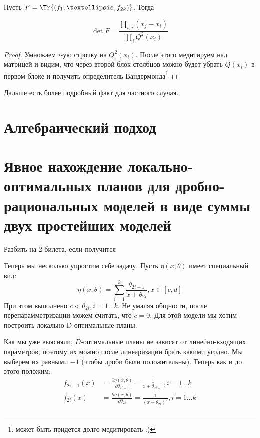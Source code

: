 Пусть $F = \Tr{(f_1, …, f_{2k})}$. Тогда 
\begin{thm}
\begin{equation}
\label{rationModelDet}
\det F = \frac{\prod\limits_{i,j} (x_j - x_i)}{\prod\limits_{i} Q^2(x_i)}
\end{equation}
\end{thm}
\begin{proof}
Умножаем  $i$-ую строчку на $Q^2(x_i)$. После этого медитируем над матрицей и видим, что через второй блок столбцов можно будет убрать $Q(x_i)$ в первом блоке и получить определитель Вандермонда\footnote{может быть придется долго медитировать :)}
\end{proof}

{\color{blue} Дальше есть более подробный факт для частного случая. }

\section{Алгебраический подход}
\section{Явное нахождение локально-оптимальных планов для дробно-рациональных моделей в виде суммы двух простейших моделей}

{\color{blue} Разбить на 2 билета, если получится}

Теперь мы несколько упростим себе задачу. Пусть $\eta(x, \theta)$ имеет специальный вид:
\begin{equation}
\label{simplRatModel}
\eta(x,\theta) = \sum\limits_{i=1}^{k} \frac{\theta_{2i-1}}{x+\theta_{2i}}, x\in[c,d]
\end{equation}
При этом выполнено $c < \theta_{2i}, i=1…k$. Не умаляя общности, после перепарамметризации можем считать,  что $c=0$. Для этой модели мы хотим построить локально D-оптимальные планы.

Как мы уже выясняли, $D$-оптимальные планы не зависят от линейно-входящих параметров, поэтому их можно после линеаризации брать какими угодно. Мы выберем их равными $-1$ (чтобы дроби были положительны). Теперь как и до этого положим:
\begin{align*}
f_{2i-1}(x) &= \frac{\partial \eta(x, \theta)}{\partial{\theta_{2i-1}}} = \frac{1}{x+\theta_{2i-1}}, i =1 … k \\
f_{2i}(x) &= \frac{\partial \eta(x, \theta)}{\partial{\theta_{2i}}} = \frac{1}{(x+\theta_{2i})^2}, i =1…k\\
\end{align*}

